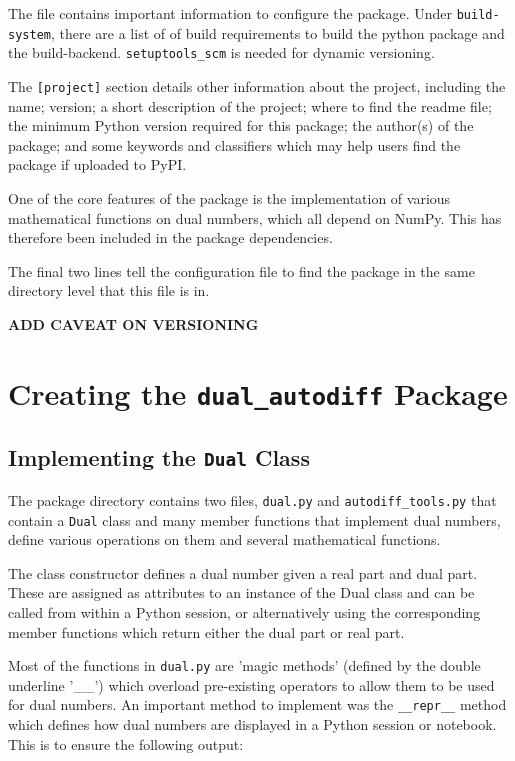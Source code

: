 \documentclass{article}
\begin{document}
The file contains important information to configure the package. Under \texttt{build-system}, there are a list of of build requirements to build the python package and the build-backend. \texttt{setuptools\_scm} is needed for dynamic versioning. 

The \texttt{[project]} section details other information about the project, including the name; version; a short description of the project; where to find the readme file; the minimum Python version required for this package; the author(s) of the package; and some keywords and classifiers which may help users find the package if uploaded to PyPI. 

One of the core features of the package is the implementation of various mathematical functions on dual numbers, which all depend on NumPy. This has therefore been included in the package dependencies.

The final two lines tell the configuration file to find the package in the same directory level that this file is in.

\textbf{ADD CAVEAT ON VERSIONING}

\section{ Creating the \texttt{dual\_autodiff} Package}

\subsection{Implementing the \texttt{Dual} Class}

The package directory contains two files, \texttt{dual.py} and \texttt{autodiff\_tools.py} that contain a \texttt{Dual} class and many member functions that implement dual numbers, define various operations on them and several mathematical functions. 

The class constructor defines a dual number given a real part and dual part. These are assigned as attributes to an instance of the Dual class and can be called from within a Python session, or alternatively using the corresponding member functions which return either the dual part or real part. 

Most of the functions in \texttt{dual.py} are 'magic methods' (defined by the double underline '\_\_') which overload pre-existing operators to allow them to be used for dual numbers. An important method to implement was the \texttt{\_\_repr\_\_} method which defines how dual numbers are displayed in a Python session or notebook. This is to ensure the following output: 
\end{document}
